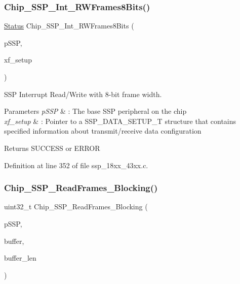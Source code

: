 \subsubsection{\texorpdfstring{Chip\+\_\+\+S\+S\+P\+\_\+\+Int\+\_\+\+R\+W\+Frames8\+Bits()}{Chip\_SSP\_Int\_RWFrames8Bits()}}
{\footnotesize\ttfamily \hyperlink{group___l_p_c___types___public___types_ga67a0db04d321a74b7e7fcfd3f1a3f70b}{Status} Chip\+\_\+\+S\+S\+P\+\_\+\+Int\+\_\+\+R\+W\+Frames8\+Bits (\begin{DoxyParamCaption}\item[{\hyperlink{struct_l_p_c___s_s_p___t}{L\+P\+C\+\_\+\+S\+S\+P\+\_\+T} $\ast$}]{p\+S\+SP,  }\item[{\hyperlink{struct_chip___s_s_p___d_a_t_a___s_e_t_u_p___t}{Chip\+\_\+\+S\+S\+P\+\_\+\+D\+A\+T\+A\+\_\+\+S\+E\+T\+U\+P\+\_\+T} $\ast$}]{xf\+\_\+setup }\end{DoxyParamCaption})}



S\+SP Interrupt Read/\+Write with 8-\/bit frame width. 


\begin{DoxyParams}{Parameters}
{\em p\+S\+SP} & \+: The base S\+SP peripheral on the chip \\
\hline
{\em xf\+\_\+setup} & \+: Pointer to a S\+S\+P\+\_\+\+D\+A\+T\+A\+\_\+\+S\+E\+T\+U\+P\+\_\+T structure that contains specified information about transmit/receive data configuration \\
\hline
\end{DoxyParams}
\begin{DoxyReturn}{Returns}
S\+U\+C\+C\+E\+SS or E\+R\+R\+OR 
\end{DoxyReturn}


Definition at line 352 of file ssp\+\_\+18xx\+\_\+43xx.\+c.

\mbox{\label{group___s_s_p__18_x_x__43_x_x_ga8332233bb63af754bd9cc369f2a1e2d6}} 
\subsubsection{\texorpdfstring{Chip\+\_\+\+S\+S\+P\+\_\+\+Read\+Frames\+\_\+\+Blocking()}{Chip\_SSP\_ReadFrames\_Blocking()}}
{\footnotesize\ttfamily uint32\+\_\+t Chip\+\_\+\+S\+S\+P\+\_\+\+Read\+Frames\+\_\+\+Blocking (\begin{DoxyParamCaption}\item[{\hyperlink{struct_l_p_c___s_s_p___t}{L\+P\+C\+\_\+\+S\+S\+P\+\_\+T} $\ast$}]{p\+S\+SP,  }\item[{uint8\+\_\+t $\ast$}]{buffer,  }\item[{uint32\+\_\+t}]{buffer\+\_\+len }\end{DoxyParamCaption})}




